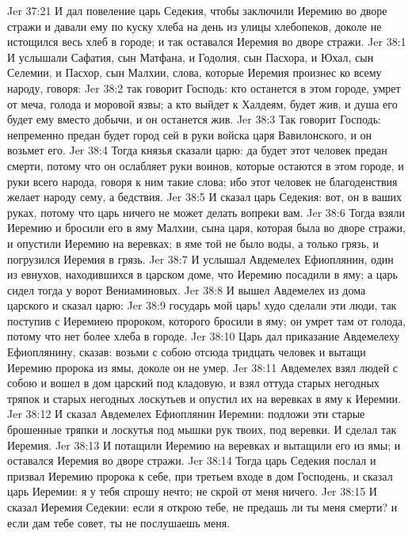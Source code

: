 \vs Jer 37:21 И дал повеление царь Седекия, чтобы заключили Иеремию во дворе стражи и давали ему по куску хлеба на день из улицы хлебопеков, доколе не истощился весь хлеб в городе; и так оставался Иеремия во дворе стражи.
\vs Jer 38:1 И услышали Сафатия, сын Матфана, и Годолия, сын Пасхора, и Юхал, сын Селемии, и Пасхор, сын Малхии, слова, которые Иеремия произнес ко всему народу, говоря:
\vs Jer 38:2 так говорит Господь: кто останется в этом городе, умрет от меча, голода и моровой язвы; а кто выйдет к Халдеям, будет жив, и душа его будет ему вместо добычи, и он останется жив.
\vs Jer 38:3 Так говорит Господь: непременно предан будет город сей в руки войска царя Вавилонского, и он возьмет его.
\vs Jer 38:4 Тогда князья сказали царю: да будет этот человек предан смерти, потому что он ослабляет руки воинов, которые остаются в этом городе, и руки всего народа, говоря к ним такие слова; ибо этот человек не благоденствия желает народу сему, а бедствия.
\vs Jer 38:5 И сказал царь Седекия: вот, он в ваших руках, потому что царь ничего не может делать вопреки вам.
\vs Jer 38:6 Тогда взяли Иеремию и бросили его в яму Малхии, сына царя, которая была во дворе стражи, и опустили Иеремию на веревках; в яме той не было воды, а только грязь, и погрузился Иеремия в грязь.
\vs Jer 38:7 И услышал Авдемелех Ефиоплянин, один из евнухов, находившихся в царском доме, что Иеремию посадили в яму; а царь сидел тогда у ворот Вениаминовых.
\vs Jer 38:8 И вышел Авдемелех из дома царского и сказал царю:
\vs Jer 38:9 государь мой царь! худо сделали эти люди, так поступив с Иеремиею пророком, которого бросили в яму; он умрет там от голода, потому что нет более хлеба в городе.
\vs Jer 38:10 Царь дал приказание Авдемелеху Ефиоплянину, сказав: возьми с собою отсюда тридцать человек и вытащи Иеремию пророка из ямы, доколе он не умер.
\vs Jer 38:11 Авдемелех взял людей с собою и вошел в дом царский под кладовую, и взял оттуда старых негодных тряпок и старых негодных лоскутьев и опустил их на веревках в яму к Иеремии.
\vs Jer 38:12 И сказал Авдемелех Ефиоплянин Иеремии: подложи эти старые брошенные тряпки и лоскутья под мышки рук твоих, под веревки. И сделал так Иеремия.
\vs Jer 38:13 И потащили Иеремию на веревках и вытащили его из ямы; и оставался Иеремия во дворе стражи.
\rsbpar\vs Jer 38:14 Тогда царь Седекия послал и призвал Иеремию пророка к себе, при третьем входе в дом Господень, и сказал царь Иеремии: я у тебя спрошу нечто; не скрой от меня ничего.
\vs Jer 38:15 И сказал Иеремия Седекии: если я открою тебе, не предашь ли ты меня смерти? и если дам тебе совет, ты не послушаешь меня.
